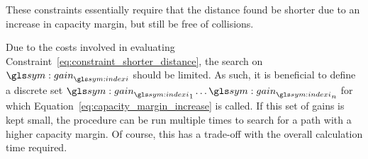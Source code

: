 		These constraints essentially require that the distance found be shorter
		due to an increase in capacity margin, but still be free of collisions.

		Due to the costs involved in evaluating
		Constraint~\ref{eq:constraint_shorter_distance}, the search on
		${\gain}_{\indexi}$ should be limited. As such, it is beneficial to
		define a discrete set ${{\gain}_{\indexi}}_1 \ldots
		{{\gain}_{\indexi}}_n$ for which
		Equation~\ref{eq:capacity_margin_increase} is called.
		 If this set of gains is kept small,
		the procedure can be run multiple times to search for a path with a
		higher capacity margin. Of course, this has a trade-off with the overall
		calculation time required.
